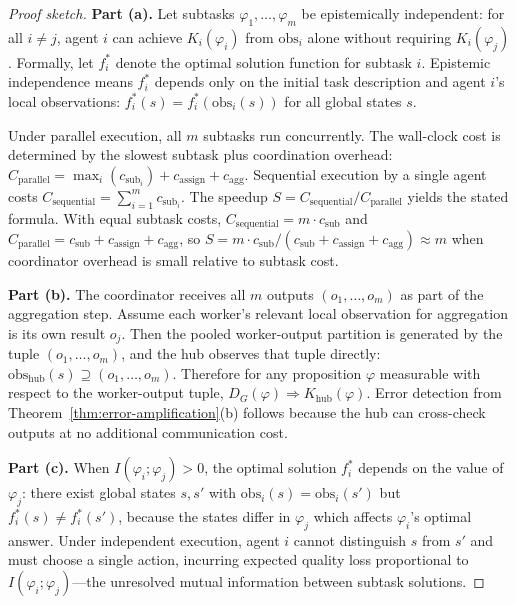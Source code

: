 \begin{proof}[Proof sketch]
\textbf{Part (a).} Let subtasks $\varphi_1, \ldots, \varphi_m$ be epistemically independent: for all $i \ne j$, agent $i$ can achieve $K_i(\varphi_i)$ from $\mathrm{obs}_i$ alone without requiring $K_i(\varphi_j)$. Formally, let $f_i^*$ denote the optimal solution function for subtask $i$. Epistemic independence means $f_i^*$ depends only on the initial task description and agent $i$'s local observations: $f_i^*(s) = f_i^*(\mathrm{obs}_i(s))$ for all global states $s$.

Under parallel execution, all $m$ subtasks run concurrently. The wall-clock cost is determined by the slowest subtask plus coordination overhead: $C_{\mathrm{parallel}} = \max_i(c_{\mathrm{sub}_i}) + c_{\mathrm{assign}} + c_{\mathrm{agg}}$. Sequential execution by a single agent costs $C_{\mathrm{sequential}} = \sum_{i=1}^m c_{\mathrm{sub}_i}$. The speedup $S = C_{\mathrm{sequential}}/C_{\mathrm{parallel}}$ yields the stated formula. With equal subtask costs, $C_{\mathrm{sequential}} = m \cdot c_{\mathrm{sub}}$ and $C_{\mathrm{parallel}} = c_{\mathrm{sub}} + c_{\mathrm{assign}} + c_{\mathrm{agg}}$, so $S = m \cdot c_{\mathrm{sub}} / (c_{\mathrm{sub}} + c_{\mathrm{assign}} + c_{\mathrm{agg}}) \approx m$ when coordinator overhead is small relative to subtask cost.

\textbf{Part (b).} The coordinator receives all $m$ outputs $(o_1, \ldots, o_m)$ as part of the aggregation step. Assume each worker's relevant local observation for aggregation is its own result $o_j$. Then the pooled worker-output partition is generated by the tuple $(o_1, \ldots, o_m)$, and the hub observes that tuple directly: $\mathrm{obs}_{\mathrm{hub}}(s) \supseteq (o_1, \ldots, o_m)$. Therefore for any proposition $\varphi$ measurable with respect to the worker-output tuple, $D_G(\varphi) \Rightarrow K_{\mathrm{hub}}(\varphi)$. Error detection from Theorem~\ref{thm:error-amplification}(b) follows because the hub can cross-check outputs at no additional communication cost.

\textbf{Part (c).} When $I(\varphi_i; \varphi_j) > 0$, the optimal solution $f_i^*$ depends on the value of $\varphi_j$: there exist global states $s, s'$ with $\mathrm{obs}_i(s) = \mathrm{obs}_i(s')$ but $f_i^*(s) \ne f_i^*(s')$, because the states differ in $\varphi_j$ which affects $\varphi_i$'s optimal answer. Under independent execution, agent $i$ cannot distinguish $s$ from $s'$ and must choose a single action, incurring expected quality loss proportional to $I(\varphi_i; \varphi_j)$---the unresolved mutual information between subtask solutions.
\end{proof}

